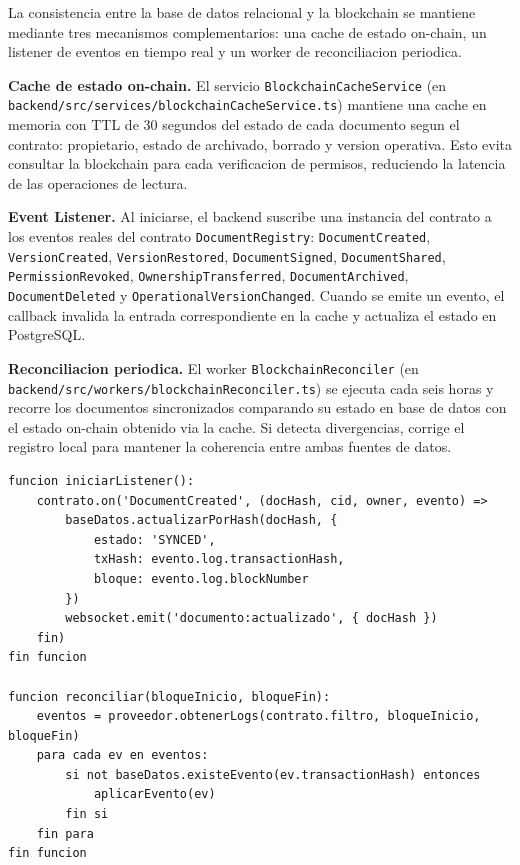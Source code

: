 \documentclass[11pt, a4paper]{article}
\begin{document}
La consistencia entre la base de datos relacional y la blockchain se mantiene mediante tres mecanismos complementarios: una cache de estado on-chain, un listener de eventos en tiempo real y un worker de reconciliacion periodica.

\textbf{Cache de estado on-chain.} El servicio \texttt{BlockchainCacheService} (en \texttt{backend/src/services/blockchainCacheService.ts}) mantiene una cache en memoria con TTL de 30 segundos del estado de cada documento segun el contrato: propietario, estado de archivado, borrado y version operativa. Esto evita consultar la blockchain para cada verificacion de permisos, reduciendo la latencia de las operaciones de lectura.

\textbf{Event Listener.} Al iniciarse, el backend suscribe una instancia del contrato a los eventos reales del contrato \texttt{DocumentRegistry}: \texttt{DocumentCreated}, \texttt{VersionCreated}, \texttt{VersionRestored}, \texttt{DocumentSigned}, \texttt{DocumentShared}, \texttt{PermissionRevoked}, \texttt{OwnershipTransferred}, \texttt{DocumentArchived}, \texttt{DocumentDeleted} y \texttt{OperationalVersionChanged}. Cuando se emite un evento, el callback invalida la entrada correspondiente en la cache y actualiza el estado en PostgreSQL.

\textbf{Reconciliacion periodica.} El worker \texttt{BlockchainReconciler} (en \texttt{backend/src/workers/blockchainReconciler.ts}) se ejecuta cada seis horas y recorre los documentos sincronizados comparando su estado en base de datos con el estado on-chain obtenido via la cache. Si detecta divergencias, corrige el registro local para mantener la coherencia entre ambas fuentes de datos.

\begin{lstlisting}[caption={Pseudocodigo del listener y reconciliacion}, label={lst:sync}]
funcion iniciarListener():
    contrato.on('DocumentCreated', (docHash, cid, owner, evento) =>
        baseDatos.actualizarPorHash(docHash, {
            estado: 'SYNCED',
            txHash: evento.log.transactionHash,
            bloque: evento.log.blockNumber
        })
        websocket.emit('documento:actualizado', { docHash })
    fin)
fin funcion

funcion reconciliar(bloqueInicio, bloqueFin):
    eventos = proveedor.obtenerLogs(contrato.filtro, bloqueInicio, bloqueFin)
    para cada ev en eventos:
        si not baseDatos.existeEvento(ev.transactionHash) entonces
            aplicarEvento(ev)
        fin si
    fin para
fin funcion
\end{lstlisting}
\end{document}
